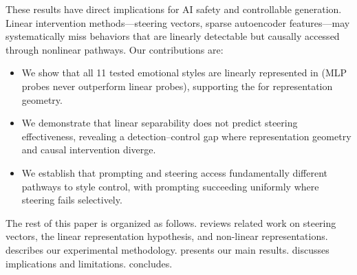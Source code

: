 These results have direct implications for AI safety and controllable generation. Linear intervention methods---steering vectors, sparse autoencoder features---may systematically miss behaviors that are linearly detectable but causally accessed through nonlinear pathways. Our contributions are:
\begin{itemize}[leftmargin=*,itemsep=0pt,topsep=0pt]
    \item We show that all 11 tested emotional styles are linearly represented in \pythia (MLP probes never outperform linear probes), supporting the \lrh for representation geometry.
    \item We demonstrate that linear separability does not predict steering effectiveness, revealing a detection--control gap where representation geometry and causal intervention diverge.
    \item We establish that prompting and steering access fundamentally different pathways to style control, with prompting succeeding uniformly where steering fails selectively.
\end{itemize}

The rest of this paper is organized as follows.  reviews related work on steering vectors, the linear representation hypothesis, and non-linear representations.  describes our experimental methodology.  presents our main results.  discusses implications and limitations.  concludes.
